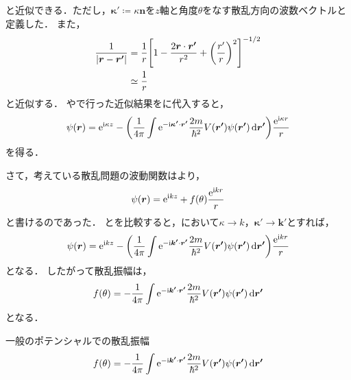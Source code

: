 \documentclass{report}
\begin{document}
    と近似できる．ただし，$\bm{\kappa'} \coloneqq \kappa \bm{n}$を$z$軸と角度$\theta$をなす散乱方向の波数ベクトルと定義した．
    また，
    \begin{align}
      \frac{1}{\abs{\bm{r} - \bm{r'}}} &= \frac{1}{r}\qty[1 - \frac{2\bm{r}\cdot\bm{r'}}{r^2} + \qty(\frac{r'}{r})^2]^{-1/2} \\ 
      &\simeq \frac{1}{r}\label{abs-r-r-prime-inv-approx}
    \end{align}
    と近似する．%
    やで行った近似結果をに代入すると，
    \begin{align}
      \psi(\bm{r}) = \mathrm{e}^{\mathrm{i}\kappa z} - \qty(\frac{1}{4\pi} \int \mathrm{e}^{-\mathrm{i}\bm{\kappa'}\cdot \bm{r'}} \frac{2m}{\hbar^2}V(\bm{r'})\psi(\bm{r'})\dd{\bm{r'}})\frac{\mathrm{e}^{\mathrm{i}\kappa r}}{r}\label{psi-r-in-sc-kappa}
    \end{align}
    を得る．
    \par
    さて，考えている散乱問題の波動関数はより，
    \begin{align}
      \psi(\bm{r}) = \mathrm{e}^{\mathrm{i} kz} + f(\theta) \frac{\mathrm{e}^{\mathrm{i} kr}}{r}\label{psi-r-in-sc-k-re}
    \end{align}
    と書けるのであった．
    とを比較すると，において$\kappa \to k$，$\bm{\kappa'} \to \bm{k'}$とすれば，
    \begin{align}
      \psi(\bm{r}) = \mathrm{e}^{\mathrm{i} kz} - \qty(\frac{1}{4\pi} \int \mathrm{e}^{-\mathrm{i}\bm{k'}\cdot \bm{r'}} \frac{2m}{\hbar^2}V(\bm{r'})\psi(\bm{r'})\dd{\bm{r'}})\frac{\mathrm{e}^{\mathrm{i} kr}}{r}
    \end{align}
    となる．
    したがって散乱振幅は，
    \begin{align}
      f(\theta) = -\frac{1}{4\pi} \int \mathrm{e}^{- \mathrm{i} \bm{k'} \cdot \bm{r'}} \frac{2m}{\hbar^2}V(\bm{r'})\psi(\bm{r'})\dd{\bm{r'}}
    \end{align}
    となる．
    \begin{itembox}[l]{一般のポテンシャルでの散乱振幅}
      \begin{align}
        f(\theta) = -\frac{1}{4\pi} \int \mathrm{e}^{- \mathrm{i} \bm{k'} \cdot \bm{r'}} \frac{2m}{\hbar^2}V(\bm{r'})\psi(\bm{r'})\dd{\bm{r'}}\label{scattering-amp-general}
      \end{align}
    \end{itembox}
\end{document}
